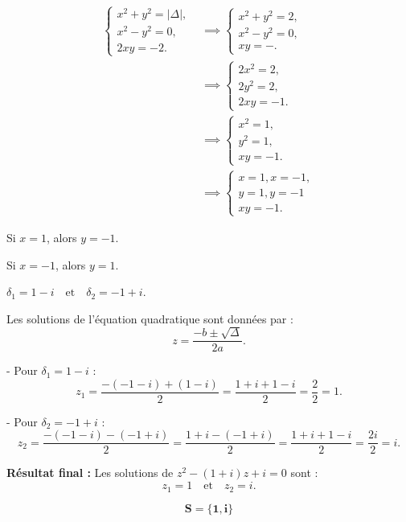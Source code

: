 \documentclass[12pt,a4paper]{article}
\begin{document}
\begin{enumerate}
\begin{align*}
\begin{cases}
x^2 + y^2 = | \Delta |, \\
x^2 - y^2 = 0, \\
2xy = -2.
\end{cases} &\implies 
\begin{cases}
x^2 + y^2 = 2, \\
x^2 - y^2 = 0, \\
xy = -.
\end{cases}\\&\implies 
\begin{cases}
2x^2  = 2, \\
2y^2 = 2, \\
2xy = -1.
\end{cases}\\&\implies 
\begin{cases}
x^2  = 1, \\
y^2 = 1, \\
xy = -1.
\end{cases}\\&\implies 
\begin{cases}
x  = 1, x  = -1 , \\
y = 1, y = -1 \\
xy = -1.
\end{cases}
\end{align*}

  Si \( x = 1 \), alors \( y = -1 \).
    
  Si \( x = -1 \), alors \( y = 1 \).

\(
\delta_1 = 1 - i \quad \text{et} \quad \delta_2 = -1 + i.
\)
 
Les solutions de l’équation quadratique sont données par :
\[
z = \frac{-b \pm \sqrt{\Delta}}{2a}.
\]

- Pour \( \delta_1 = 1 - i \) :
  \[
  z_1 = \frac{-(-1 - i) + (1 - i)}{2} = \frac{1 + i + 1 - i}{2} = \frac{2}{2} = 1.
  \]

- Pour \( \delta_2 = -1 + i \) :
  \[
  z_2 = \frac{-(-1 - i) - (-1 + i)}{2} = \frac{1 + i - (-1 + i)}{2} = \frac{1 + i + 1 - i}{2} = \frac{2i}{2} = i.
  \]

\textbf{Résultat final :}  
Les solutions de \( z^2 - (1 + i)z + i = 0 \) sont :
\[
z_1 = 1 \quad \text{et} \quad z_2 = i.
\]

\begin{resultbox}
    \[
    \mathbf{ S = \{ 1,i \} }
    \]
\end{resultbox}

\end{enumerate}
\end{document}
